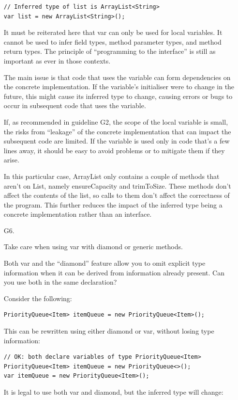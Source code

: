 \documentclass[11pt,a4paper, titlepage, parskip=half, headsepline, footsepline, cleardoublepage=current, headheight=1cm]{scrbook}
\begin{document}
\begin{enumerate}
{\begin{lstlisting}
// Inferred type of list is ArrayList<String>
var list = new ArrayList<String>();
\end{lstlisting}

It must be reiterated here that var can only be used for local variables. It cannot be used to infer field types, method parameter types, and method return types. The principle of “programming to the interface” is still as important as ever in those contexts.

The main issue is that code that uses the variable can form dependencies on the concrete implementation. If the variable’s initialiser were to change in the future, this might cause its inferred type to change, causing errors or bugs to occur in subsequent code that uses the variable.

If, as recommended in guideline G2, the scope of the local variable is small, the risks from “leakage” of the concrete implementation that can impact the subsequent code are limited. If the variable is used only in code that’s a few lines away, it should be easy to avoid problems or to mitigate them if they arise.

In this particular case, ArrayList only contains a couple of methods that aren’t on List, namely ensureCapacity and trimToSize. These methods don’t affect the contents of the list, so calls to them don’t affect the correctness of the program. This further reduces the impact of the inferred type being a concrete implementation rather than an interface.}
\item[G6.]{Take care when using var with diamond or generic methods.

Both var and the “diamond” feature allow you to omit explicit type information when it can be derived from information already present. Can you use both in the same declaration?

Consider the following:

\begin{lstlisting}
PriorityQueue<Item> itemQueue = new PriorityQueue<Item>();
\end{lstlisting}
This can be rewritten using either diamond or var, without losing type information:

\begin{lstlisting}
// OK: both declare variables of type PriorityQueue<Item>
PriorityQueue<Item> itemQueue = new PriorityQueue<>();
var itemQueue = new PriorityQueue<Item>();
\end{lstlisting}

It is legal to use both var and diamond, but the inferred type will change:

}
\end{enumerate}
\end{document}
